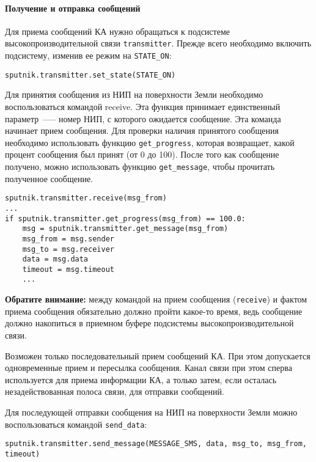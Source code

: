 \documentclass[12pt,a4paper]{article}
\begin{document}
\paragraph{Получение и отправка сообщений}

Для приема сообщений КА нужно обращаться к подсистеме высокопроизводительной связи
\verb'transmitter'. Прежде всего необходимо включить подсистему,  изменив ее режим на
\verb'STATE_ON':

\begin{verbatim}
sputnik.transmitter.set_state(STATE_ON)
\end{verbatim}

Для принятия сообщения из НИП на поверхности Земли необходимо воспользоваться командой
receive. Эта функция принимает единственный параметр~--— номер НИП, с которого ожидается
сообщение. Эта команда начинает прием сообщения. Для проверки наличия принятого сообщения
необходимо использовать функцию \verb'get_progress', которая возвращает, какой процент сообщения
был принят (от 0 до 100). После того как сообщение получено, можно использовать функцию
\verb'get_message', чтобы прочитать полученное сообщение.

\begin{verbatim}
sputnik.transmitter.receive(msg_from)
...
if sputnik.transmitter.get_progress(msg_from) == 100.0:     
    msg = sputnik.transmitter.get_message(msg_from)
    msg_from = msg.sender
    msg_to = msg.receiver
    data = msg.data
    timeout = msg.timeout
    ...
\end{verbatim}

\textbf{Обратите внимание:} между командой на прием сообщения (\verb'receive') и фактом приема сообщения
обязательно должно пройти какое-то время, ведь сообщение должно накопиться в приемном
буфере подсистемы высокопроизводительной связи.

Возможен только последовательный прием сообщений КА. При этом допускается одновременные
прием и пересылка сообщения. Канал связи при этом сперва используется для приема
информации КА, а только затем, если осталась незадействованная полоса связи, для отправки
сообщений.

Для последующей отправки сообщения на НИП на поверхности Земли можно воспользоваться
командой \verb'send_data':

\begin{verbatim}
sputnik.transmitter.send_message(MESSAGE_SMS, data, msg_to, msg_from, timeout)
\end{verbatim}
\end{document}
